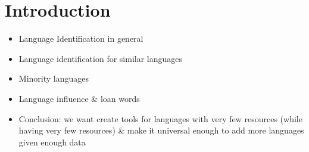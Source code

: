 \chapter{Introduction}

\begin{itemize}
    \item Language Identification in general
    \item Language identification for similar languages
    \item Minority languages
    \item Language influence \& loan words
    \item Conclusion: we want create tools for languages with very few resources (while having very few resources) \& make it universal enough to add more languages given enough data
\end{itemize}